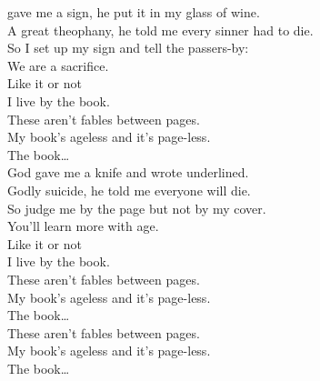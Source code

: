 
 gave me a sign, he put it in my glass of wine. \\
A great theophany, he told me every sinner had to die. \\
So I set up my sign and tell the passers-by: \\
We are a sacrifice. \\
Like it or not \\
I live by the book. \\

These aren't fables between pages. \\
My book's ageless and it's page-less. \\

The book… \\

God gave me a knife and wrote  underlined. \\
Godly suicide, he told me everyone will die. \\
So judge me by the page but not by my cover. \\
You'll learn more with age. \\
Like it or not \\
I live by the book. \\

These aren't fables between pages. \\
My book's ageless and it's page-less. \\

The book… \\

These aren't fables between pages. \\
My book's ageless and it's page-less. \\

The book… \\










